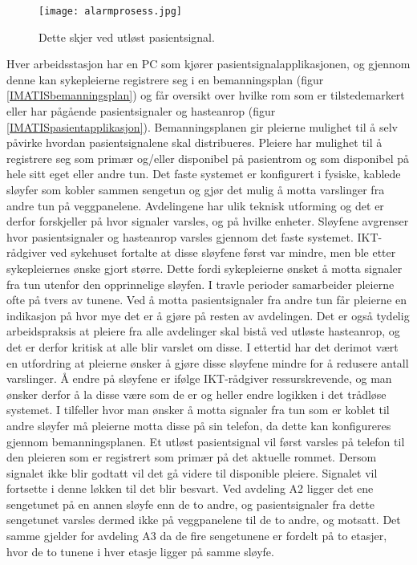 \begin{figure}[H]
\centering
\texttt{[image: alarmprosess.jpg]}
\caption{Dette skjer ved utløst pasientsignal.}
\label{fig:detteskjer}
\end{figure}

\noindent
Hver arbeidsstasjon har en PC som kjører pasientsignalapplikasjonen, og gjennom denne kan sykepleierne registrere seg i en bemanningsplan (figur \ref{IMATISbemanningsplan}) og får oversikt over hvilke rom som er tilstedemarkert eller har pågående pasientsignaler og hasteanrop (figur \ref{IMATISpasientapplikasjon}). Bemanningsplanen gir pleierne mulighet til å selv påvirke hvordan pasientsignalene skal distribueres. Pleiere har mulighet til å registrere seg som primær og/eller disponibel på pasientrom og som disponibel på hele sitt eget eller andre tun.
Det faste systemet er konfigurert i fysiske, kablede sløyfer som kobler sammen sengetun og gjør det mulig å motta varslinger fra andre tun på veggpanelene. 
Avdelingene har ulik teknisk utforming og det er derfor forskjeller på hvor signaler varsles, og på hvilke enheter. Sløyfene avgrenser hvor pasientsignaler og hasteanrop varsles gjennom det faste systemet. IKT-rådgiver ved sykehuset fortalte at disse sløyfene først var mindre, men ble etter sykepleiernes ønske gjort større. Dette fordi sykepleierne ønsket å motta signaler fra tun utenfor den opprinnelige sløyfen. I travle perioder samarbeider pleierne ofte på tvers av tunene. Ved å motta pasientsignaler fra andre tun får pleierne en indikasjon på hvor mye det er å gjøre på resten av avdelingen. Det er også tydelig arbeidspraksis at pleiere fra alle avdelinger skal bistå ved utløste hasteanrop, og det er derfor kritisk at alle blir varslet om disse. I ettertid har det derimot vært en utfordring at pleierne ønsker å gjøre disse sløyfene mindre for å redusere antall varslinger. Å endre på sløyfene er ifølge IKT-rådgiver ressurskrevende, og man ønsker derfor å la disse være som de er og heller endre logikken i det trådløse systemet.
I tilfeller hvor man ønsker å motta signaler fra tun som er koblet til andre sløyfer må pleierne motta disse på sin telefon, da dette kan konfigureres gjennom bemanningsplanen. Et utløst pasientsignal vil først varsles på telefon til den pleieren som er registrert som primær på det aktuelle rommet. Dersom signalet ikke blir godtatt vil det gå videre til disponible pleiere. Signalet vil fortsette i denne løkken til det blir besvart. Ved avdeling A2 ligger det ene sengetunet på en annen sløyfe enn de to andre, og pasientsignaler fra dette sengetunet varsles dermed ikke på veggpanelene til de to andre, og motsatt. Det samme gjelder for avdeling A3 da de fire sengetunene er fordelt på to etasjer, hvor de to tunene i hver etasje ligger på samme sløyfe. 

